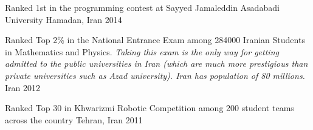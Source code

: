 \begin{cvhonors}
  \cvhonor
    {Ranked 1st} %
    {in the programming contest at Sayyed Jamaleddin Asadabadi University} %
    {Hamadan, Iran} %
    {2014} %

  \cvhonor
    {Ranked Top 2\%} %
    {in the National Entrance Exam among 284000 Iranian Students in Mathematics and Physics. \textit{Taking this exam is the only way for getting admitted to the public universities in Iran (which are much more prestigious than private universities such as Azad university). Iran has population of 80 millions.}} %
    {Iran} %
    {2012} %

  \cvhonor
    {Ranked Top 30}
    {in Khwarizmi Robotic Competition among 200 student teams across the country}
    {Tehran, Iran}
    {2011}
    

\end{cvhonors}
